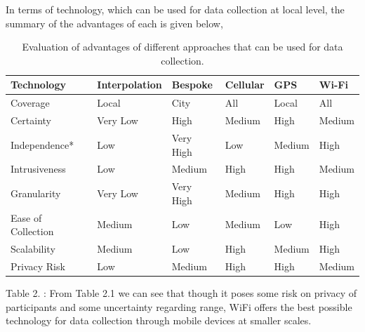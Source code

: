 In terms of technology, which can be used for data collection at local level, the summary of the advantages of each is given below,

\begin{table}
  \footnotesize
  \begin{center}
    \begin{tabular}{p{2.25cm}p{1.5cm}p{1.3cm}p{1.3cm}p{1.3cm}p{1.3cm}}
      \toprule
        Technology & Interpolation & Bespoke & Cellular & GPS & Wi-Fi \\
      \midrule
        Coverage & Local & City & All & Local & All\\
        \addlinespace[0.2cm]
        Certainty & Very Low & High & Medium & High & Medium \\
        \addlinespace[0.2cm]
        Independence* & Low & Very High & Low & Medium & High \\
        \addlinespace[0.2cm]
        Intrusiveness & Low & Medium & High & High & Medium \\
        \addlinespace[0.2cm]
        Granularity & Very Low & Very High & Medium & High & High \\
        \addlinespace[0.2cm]
        Ease of Collection & Medium & Low & Medium & Low & High \\
        \addlinespace[0.2cm]
        Scalability & Medium & Low & High & Medium & High \\
        \addlinespace[0.2cm]
        Privacy Risk & Low & Medium & High & High & Medium \\
      \bottomrule
    \end{tabular}
  \end{center}
  \caption{Evaluation of advantages of different approaches that can be used for data collection.}
  \label{test}
\end{table}





Table 2.
: 
From Table 2.1 we can see that though it poses some risk on privacy of participants and some uncertainty regarding range, WiFi offers the best possible technology for data collection through mobile devices at smaller scales.

